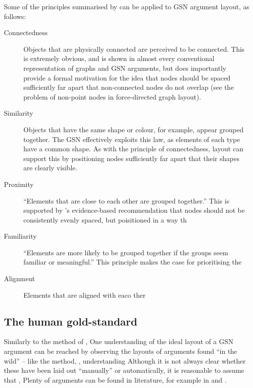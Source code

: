 Some of the principles summarised by \citet{kennysun} can be applied to GSN argument layout, as follows:

\begin{description}
    \item[Connectedness] Objects that are physically connected are perceived to be connected. This is extremely obvious, and is shown in almost every conventional representation of graphs and GSN arguments, but does importantly provide a formal motivation for the idea that nodes should be spaced sufficiently far apart that non-connected nodes do not overlap (see the problem of non-point nodes in force-directed graph layout). 

    \item[Similarity] Objects that have the same shape or colour, for example, appear grouped together.
    The GSN effectively exploits this law, as elements of each type have a common shape. As with the principle of connectedness, layout can support this by positioning nodes sufficiently far apart that their shapes are clearly visible.
    
    \item[Proximity] ``Elements that are close to each other are grouped together.'' This is supported by \citet{huang2007effects}'s evidence-based recommendation that nodes should not be consistently evenly spaced, but poisitioned in a way th
    
    \item[Familiarity] ``Elements are more likely to be grouped together if the groups seem familiar or meaningful.'' This principle makes the case for prioritising the  
    
    \item[Alignment] Elements that are aligned with eaco ther

\end{description}



\subsection{The human gold-standard \label{sec:humangold}}

Similarly to the method of \citet{5674033}, One understanding of the ideal layout of a GSN argument can be reached by observing the layouts of arguments found ``in the wild'' -- like the method, , understanding 
Although it is not always clear whether these have been laid out ``manually'' or automatically, it is reasonable to assume that , 
Plenty of arguments can be found in literature, for example in \cite{Habli:2006:PPC:1183088.1183090} and  \cite{insilico}.

